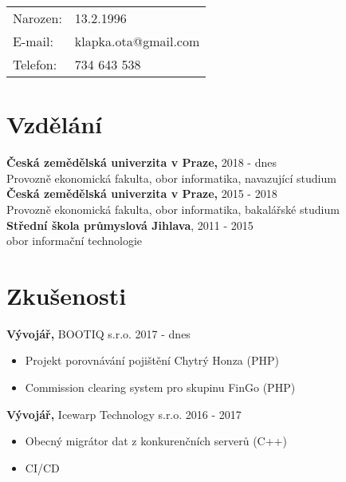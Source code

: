 \documentclass[margin]{res}
\begin{document}
 
 
  
\begin{resume} 

\begin{tabular}{ll}
        Narozen: &  13.2.1996 \\
        E-mail: & klapka.ota@gmail.com \\
        Telefon: & 734 643 538 \\
    \end{tabular}

\section{Vzdělání} 
\textbf{Česká zemědělská univerzita v Praze,} \hfill  2018 - dnes \\
Provozně ekonomická fakulta, obor informatika, navazující studium\\
\textbf{Česká zemědělská univerzita v Praze,} \hfill  2015 - 2018 \\
Provozně ekonomická fakulta, obor informatika, bakalářské studium \\
\textbf{Střední škola průmyslová Jihlava}, \hfill  2011 - 2015 \\
obor informační technologie

\section{Zkušenosti}
 \textbf{Vývojář,} BOOTIQ s.r.o. \hfill 2017 - dnes
 \begin{itemize} \itemsep -2pt  %
 \item Projekt porovnávání pojištění Chytrý Honza (PHP)
 \item Commission clearing system pro skupinu FinGo (PHP)
 \end{itemize}

 \textbf{Vývojář,} Icewarp Technology s.r.o. \hfill 2016 - 2017
 \begin{itemize} \itemsep -2pt  %
 \item Obecný migrátor dat z konkurenčních serverů (C++)
 \item CI/CD
 \end{itemize}


\end{resume}
\end{document}
